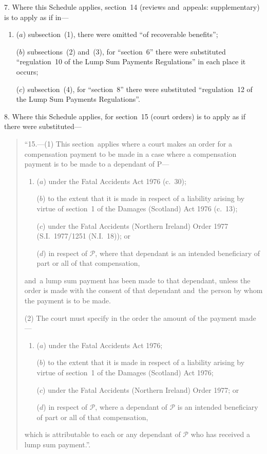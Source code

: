 \documentclass[12pt,a4paper]{article}
\begin{document}

\medskip

7.  Where this Schedule applies, section~14 (reviews and~appeals: supplementary) is to apply as if in—
\begin{enumerate}\item[]
($a$) subsection~(1), there were omitted “of recoverable benefits”;

($b$) subsections~(2) and~(3), for “section~6” there were substituted “regulation~10 of the Lump Sum Payments Regulations” in each place it occurs;

($c$) subsection~(4), for “section~8” there were substituted “regulation~12 of the Lump Sum Payments Regulations”.
\end{enumerate}

\medskip

8.  Where this Schedule applies, for section~15 (court orders) is to apply as if there were substituted—
\begin{quotation}
“15.---(1)  This section~applies where a court makes an order for a compensation payment to be made in a case where a compensation payment is to be made to a dependant of P—
\begin{enumerate}\item[]
($a$) under the Fatal Accidents Act 1976 (c.~30);

($b$) to the extent that it is made in respect of a liability arising by virtue of section~1 of the Damages (Scotland) Act 1976 (c.~13);

($c$) under the Fatal Accidents (Northern Ireland) Order 1977 (S.I.~1977/1251 (N.I.~18)); or

($d$) in respect of $\mathcal{P}$, where that dependant is an intended beneficiary of part or all of that compensation,
\end{enumerate}
and~a lump sum payment has been made to that dependant, unless the order is made with the consent of that dependant and~the person by whom the payment is to be made.

(2) The court must specify in the order the amount of the payment made—
\begin{enumerate}\item[]
($a$) under the Fatal Accidents Act 1976;

($b$) to the extent that it is made in respect of a liability arising by virtue of section~1 of the Damages (Scotland) Act 1976;

($c$) under the Fatal Accidents (Northern Ireland) Order 1977; or

($d$) in respect of $\mathcal{P}$, where a dependant of $\mathcal{P}$ is an intended beneficiary of part or all of that compensation,
\end{enumerate}
which is attributable to each or any dependant of $\mathcal{P}$ who has received a lump sum   payment.”.
\end{quotation}
\end{document}
